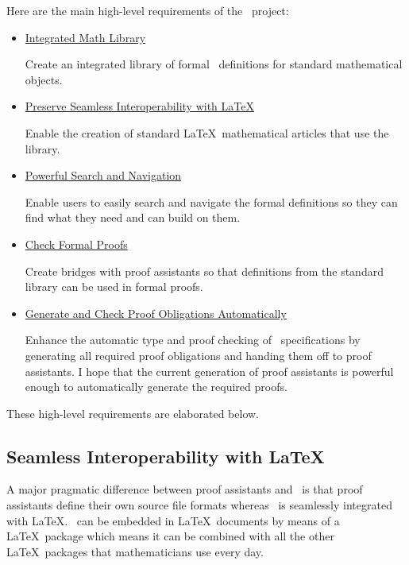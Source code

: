 \documentclass{amsart}
\begin{document}
Here are the main high-level requirements of the \mathz\ project:
\begin{itemize}

\item \hyperlink{integrated-math-library}{Integrated Math Library}

Create an integrated library of formal \ZN\ definitions for standard mathematical objects.

\item \hyperlink{seamless-interoperability-with-latex}{Preserve Seamless Interoperability with \LaTeX}

Enable the creation of standard \LaTeX\ mathematical articles that use the library.

\item \hyperlink{powerful-search-and-navigation}{Powerful Search and Navigation}

Enable users to easily search and navigate the formal definitions so they can find what they need and can build on them.

\item \hyperlink{check-formal-proof}{Check Formal Proofs}

Create bridges with proof assistants so that definitions from the standard library can be used in formal proofs.

\item \hyperlink{generate-and-check-proof-obligations-automatically}{Generate and Check Proof Obligations Automatically}

Enhance the automatic type and proof checking of \ZN\ specifications by generating all required proof obligations and handing them off to proof assistants.
I hope that the current generation of proof assistants is powerful enough to automatically generate the required proofs.

\end{itemize}

These high-level requirements are elaborated below.

\hypertarget{seamless-interoperability-with-latex}{}
\subsection{Seamless Interoperability with \LaTeX}

A major pragmatic difference between proof assistants and \ZN\ is that proof assistants define their own source file formats whereas
\ZN\ is seamlessly integrated with \LaTeX. 
\ZN\ can be embedded in \LaTeX\ documents by means of a \LaTeX\ package which means it can be combined with all the other \LaTeX\
packages that mathematicians use every day.
\end{document}
